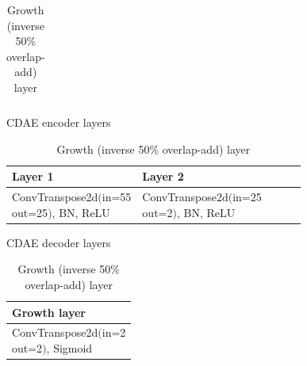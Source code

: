 \documentclass[report.tex]{subfiles}
\begin{document}
\begin{table}[ht]
\begin{tabular}{ |l|l|l|l|l| }
	 \hline
\end{tabular}
	\caption{CDAE encoder layers}
	\label{table:convtable3}
	\vspace{1em}
\begin{tabular}{ |l|l|l|l|l| }
	 \hline
		Layer 1 & Layer 2 \\
	 \hline
	 \hline
		ConvTranspose2d$\Big($\makecell[l]{in=55\\out=25}$\Big)$, BN, ReLU & ConvTranspose2d$\Big($\makecell[l]{in=25\\out=2}$\Big)$, BN, ReLU \\
	 \hline
\end{tabular}
	\caption{CDAE decoder layers}
	\label{table:convtable4}
	\vspace{1em}
\begin{tabular}{ |l| }
	 \hline
		Growth layer \\
	 \hline
	 \hline
		ConvTranspose2d$\Big($\makecell[l]{in=2\\out=2}$\Big)$, Sigmoid \\
	 \hline
\end{tabular}
	\caption{Growth (inverse 50\% overlap-add) layer}
	\label{table:convtable5}
\end{table}
\end{document}
